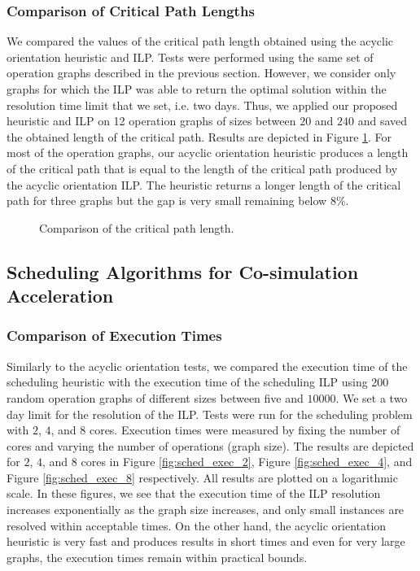 \subsubsection{Comparison of Critical Path Lengths}

We compared the values of the critical path length obtained using the acyclic orientation heuristic and ILP. Tests were performed using the same set of operation graphs described in the previous section. However, we consider only graphs for which the ILP was able to return the optimal solution within the resolution time limit that we set, i.e. two days. Thus, we applied our proposed heuristic and ILP on 12 operation graphs of sizes between $20$ and $240$ and saved the obtained length of the critical path. Results are depicted in Figure \ref{fig:orient_critpath}. For most of the operation graphs, our acyclic orientation heuristic produces a length of the critical path that is equal to the length of the critical path produced by the acyclic orientation ILP. The heuristic returns a longer length of the critical path for three graphs but the gap is very small remaining below $8\%$.  

\begin{figure}[phbt]
\centering

\caption{Comparison of the critical path length.}
\label{fig:orient_critpath}
\end{figure}


\subsection{Scheduling Algorithms for Co-simulation Acceleration}

\subsubsection{Comparison of Execution Times}

Similarly to the acyclic orientation tests, we compared the execution time of the scheduling heuristic with the execution time of the scheduling ILP using 200 random operation graphs of different sizes between five and $10000$. We set a two day limit for the resolution of the ILP. Tests were run for the scheduling problem with $2$, $4$, and $8$ cores. Execution times were measured by fixing the number of cores and varying the number of operations (graph size). The results are depicted for $2$, $4$, and $8$ cores in Figure \ref{fig:sched_exec_2}, Figure \ref{fig:sched_exec_4}, and Figure \ref{fig:sched_exec_8} respectively. All results are plotted on a logarithmic scale. In these figures, we see that the execution time of the ILP resolution increases exponentially as the graph size increases, and only small instances are resolved within acceptable times. On the other hand, the acyclic orientation heuristic is very fast and produces results in short times and even for very large graphs, the execution times remain within practical bounds.

